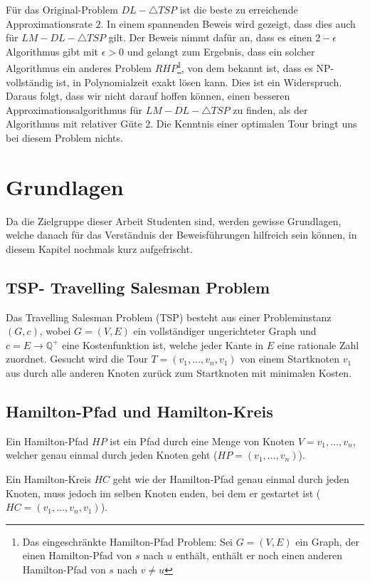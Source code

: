 \documentclass[a4paper,11pt]{scrreprt}
\begin{document}
Für das Original-Problem $DL - \triangle TSP$ ist die beste zu erreichende Approximationsrate $2$. In einem spannenden Beweis wird gezeigt, dass dies auch für $LM - DL - \triangle TSP$ gilt. Der Beweis nimmt dafür an, dass es einen $2 - \epsilon$ Algorithmus gibt mit $\epsilon > 0$ und gelangt zum Ergebnis, dass ein solcher Algorithmus ein anderes Problem $RHP$\footnote{Das eingeschränkte Hamilton-Pfad Problem: Sei $G = (V, E)$ ein Graph, der einen Hamilton-Pfad von $s$ nach $u$ enthält, enthält er noch einen anderen Hamilton-Pfad von $s$ nach $v \not= u$}, von dem bekannt ist, dass es NP-vollständig ist, in Polynomialzeit exakt lösen kann. Dies ist ein Widerspruch. Daraus folgt, dass wir nicht darauf hoffen können, einen besseren Approximationsalgorithmus für $LM - DL - \triangle TSP$ zu finden, als der Algorithmus mit relativer Güte $2$. Die Kenntnis einer optimalen Tour bringt uns bei diesem Problem nichts.
 
\chapter{Grundlagen}

Da die Zielgruppe dieser Arbeit Studenten sind, werden gewisse Grundlagen, welche danach für das Verständnis der Beweisführungen hilfreich sein können, in diesem Kapitel nochmals kurz aufgefrischt.

\section{TSP- Travelling Salesman Problem}

Das Travelling Salesman Problem (TSP) besteht aus einer Probleminstanz $(G, c)$,
wobei $G = (V, E)$ ein vollständiger ungerichteter Graph und $c = E \rightarrow \mathbb{Q}^+$ eine Kostenfunktion ist, welche jeder Kante in $E$ eine rationale Zahl
zuordnet. Gesucht wird die Tour $T = (v_1, \dots, v_n, v_1)$ von einem
Startknoten $v_1$ aus durch alle anderen Knoten zurück zum Startknoten mit minimalen Kosten. 

\section{Hamilton-Pfad und Hamilton-Kreis}

Ein Hamilton-Pfad $HP$ ist ein Pfad durch eine Menge von Knoten $V = {v_1, \dots, v_n}$, welcher genau einmal durch jeden Knoten geht ($HP = (v_1, \dots, v_n)$).

Ein Hamilton-Kreis $HC$ geht wie der Hamilton-Pfad genau einmal durch jeden Knoten, muss jedoch im selben Knoten enden, bei dem er gestartet ist ($HC = (v_1, \dots, v_n, v_1)$).
\end{document}
